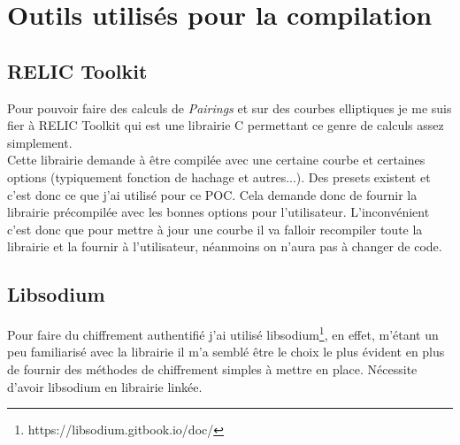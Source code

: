 \chapter{Outils utilisés pour la compilation}

\section{RELIC Toolkit}
Pour pouvoir faire des calculs de \textit{Pairings} et sur des courbes elliptiques je me suis fier à RELIC Toolkit\cite{relic-toolkit} qui est une librairie C permettant ce genre de calculs assez simplement.\\
Cette librairie demande à être compilée avec une certaine courbe et certaines options (typiquement fonction de hachage et autres...). Des presets existent et c'est donc ce que j'ai utilisé pour ce POC. Cela demande donc de fournir la librairie précompilée avec les bonnes options pour l'utilisateur. L'inconvénient c'est donc que pour mettre à jour une courbe il va falloir recompiler toute la librairie et la fournir à l'utilisateur, néanmoins on n'aura pas à changer de code.

\section{Libsodium}
Pour faire du chiffrement authentifié j'ai utilisé libsodium\footnote{https://libsodium.gitbook.io/doc/}, en effet, m'étant un peu familiarisé avec la librairie il m'a semblé être le choix le plus évident en plus de fournir des méthodes de chiffrement simples à mettre en place. Nécessite d'avoir libsodium en librairie linkée.